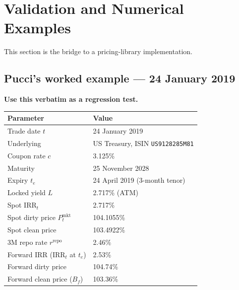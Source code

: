 \documentclass[11pt]{article}
\theoremstyle{definition}
\newcommand{\IRR}{\ensuremath{\mathrm{IRR}}}
\newcommand{\Bf}{B_f}
\newcommand{\rrepo}{r^{\mathrm{repo}}}
\begin{document}
\section{Validation and Numerical Examples}\label{sec:validation}

This section is the bridge to a pricing-library implementation.

\subsection{Pucci's worked example --- 24 January 2019}\label{sec:worked}
\textbf{Use this verbatim as a regression test.}

\begin{center}\small
\renewcommand{\arraystretch}{1.18}
\begin{tabular}{p{5.8cm} l}
\toprule
\textbf{Parameter} & \textbf{Value} \\
\midrule
Trade date $t$ & 24 January 2019 \\
Underlying & US Treasury, ISIN \texttt{US9128285M81} \\
Coupon rate $c$ & 3.125\% \\
Maturity & 25 November 2028 \\
Expiry $t_e$ & 24 April 2019 (3-month tenor) \\
Locked yield $L$ & 2.717\% (ATM) \\
Spot $\IRR_t$ & 2.717\% \\
Spot dirty price $P^{\mathrm{mkt}}_t$ & 104.1055\% \\
Spot clean price & 103.4922\% \\
3M repo rate $\rrepo$ & 2.46\% \\
Forward $\IRR$ ($\IRR_t$ at $t_e$) & 2.53\% \\
Forward dirty price & 104.74\% \\
Forward clean price ($\Bf$) & 103.36\% \\
\bottomrule
\end{tabular}
\end{center}
\end{document}

